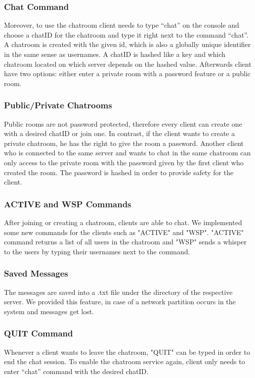 \subsubsection{Chat Command}
\label{sec:groupchat_funtionalities_chatcommand}
Moreover, to use the chatroom client needs to type “chat” on the console and choose a chatID for the chatroom and type it right next to the command “chat”. A chatroom is created with the given id, which is also a globally unique identifier in the same sense as usernames. A chatID is hashed like a key and which chatroom located on which server depends on the hashed value. Afterwards client have two options: either enter a private room with a password feature or a public room. 

\subsubsection{Public/Private Chatrooms}
\label{sec:groupchat_funtionalities_chatrooms}
Public rooms are not password protected, therefore every client can create one with a desired chatID or join one. In contrast, if the client wants to create a private chatroom, he has the right to give the room a password. Another client who is connected to the same server and wants to chat in the same chatroom can only access to the private room with the password given by the first client who created the room. The password is hashed in order to provide safety for the client.

\subsubsection{ACTIVE and WSP Commands}
\label{sec:groupchat_funtionalities_commands}
After joining or creating a chatroom, clients are able to chat. We implemented some new commands for the clients such as "ACTIVE" and "WSP". "ACTIVE" command returns a list of all users in the chatroom and "WSP" sends a whisper to the users by typing their usernames next to the command.

\subsubsection{Saved Messages}
\label{sec:groupchat_funtionalities_savedmessages}
The messages are saved into a .txt file under the directory of the respective server. We provided this feature, in case of a network partition occurs in the system and messages get lost.

\subsubsection{QUIT Command}
\label{sec:groupchat_funtionalities_savedmessages}
Whenever a client wants to leave the chatroom, "QUIT" can be typed in order to end the chat session. To enable the chatroom service again, client only needs to enter “chat” command with the desired chatID. 

